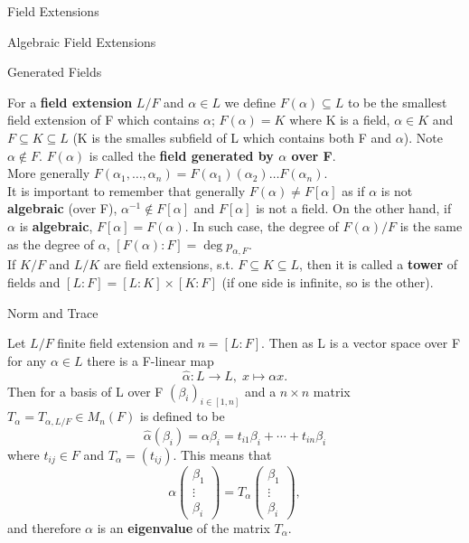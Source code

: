 \documentclass[12pt, letterpaper]{article}
\begin{document}
\begin{section}{Field Extensions}
\begin{subsection}{Algebraic Field Extensions}
  \end{subsection}

  \begin{subsection}{Generated Fields}

    For a \textbf{field extension} \(L / F\) and \(\alpha \in L\) we define
    \(F(\alpha) \subseteq L\) to be the smallest field extension of F which
    contains \(\alpha\); \(F(\alpha) = K\) where K is a field, \(\alpha \in K\)
    and \(F \subseteq K \subseteq L\) (K is the smalles subfield of L which
    contains both F and \(\alpha\)). Note \(\alpha \notin F\). \(F(\alpha)\)
    is called the \textbf{field generated by \(\alpha\) over F}. \\
    More generally \(F(\alpha_{1}, \dots , \alpha_{n}) = F(\alpha_{1})
    (\alpha_{2}) \dots F(\alpha_{n})\). \\
    It is important to remember that generally \(F(\alpha) \neq F[\alpha]\) as
    if \(\alpha\) is not \textbf{algebraic} (over F), \(\alpha^{-1} \notin
    F[\alpha]\) and \(F[\alpha]\) is not a field. On the other hand, if
    \(\alpha\) is \textbf{algebraic}, \(F[\alpha] = F(\alpha)\). In such case,
    the degree of \(F(\alpha) / F\) is the same as the degree of \(\alpha\),
    \([F(\alpha) : F]= \deg p_{\alpha, F}\). \\
    If \(K / F\) and \(L / K\) are field extensions, s.t. \(F \subseteq K
    \subseteq L\), then it is called a \textbf{tower} of fields and
    \([L : F] = [L : K] \times [K : F]\) (if one side is infinite, so is the
    other).

  \end{subsection}

  \begin{subsection}{Norm and Trace}

    Let \(L / F\) finite field extension and \(n = [L : F]\). Then as L is a
    vector space over F for any \(\alpha \in L\) there is a F-linear map
    \[\hat \alpha: L \to L, \; x \mapsto \alpha x.\]
    Then for a basis of L over F \((\beta_{i})_{i \in [1, n]}\) and a
    \(n \times n\) matrix \(T_{\alpha} = T_{\alpha, L / F} \in M_{n}(F)\) is
    defined to be \[\hat \alpha(\beta_{i}) = \alpha \beta_{i} =
      t_{i1} \beta_{i} + \cdots + t_{in} \beta_{i}\] where \(t_{ij} \in F\) and
    \(T_{\alpha} = (t_{ij})\). This means that
    \[\alpha \begin{pmatrix} \beta_{1} \\ \vdots \\ \beta_{i} \end{pmatrix} =
      T_{\alpha} \begin{pmatrix} \beta_{1} \\ \vdots \\ \beta_{i} \end{pmatrix}
      ,\]
    and therefore \(\alpha\) is an \textbf{eigenvalue} of the matrix
    \(T_{\alpha}\).


\end{subsection}
\end{section}
\end{document}
